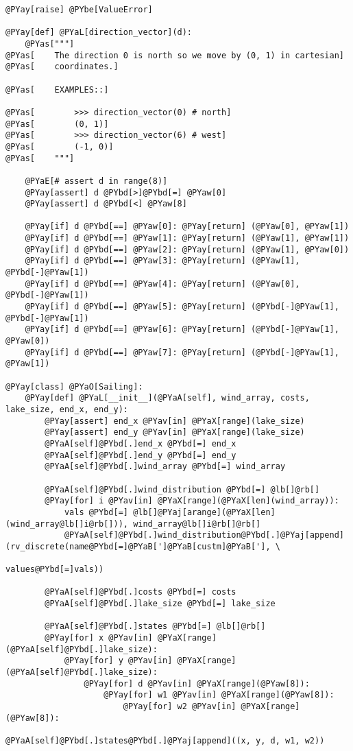 \begin{Verbatim}[commandchars=@\[\]]
    @PYay[raise] @PYbe[ValueError]

@PYay[def] @PYaL[direction_vector](d):
    @PYas["""]
@PYas[    The direction 0 is north so we move by (0, 1) in cartesian]
@PYas[    coordinates.]

@PYas[    EXAMPLES::]

@PYas[        >>> direction_vector(0) # north]
@PYas[        (0, 1)]
@PYas[        >>> direction_vector(6) # west]
@PYas[        (-1, 0)]
@PYas[    """]

    @PYaE[# assert d in range(8)]
    @PYay[assert] d @PYbd[>]@PYbd[=] @PYaw[0]
    @PYay[assert] d @PYbd[<] @PYaw[8]

    @PYay[if] d @PYbd[==] @PYaw[0]: @PYay[return] (@PYaw[0], @PYaw[1])
    @PYay[if] d @PYbd[==] @PYaw[1]: @PYay[return] (@PYaw[1], @PYaw[1])
    @PYay[if] d @PYbd[==] @PYaw[2]: @PYay[return] (@PYaw[1], @PYaw[0])
    @PYay[if] d @PYbd[==] @PYaw[3]: @PYay[return] (@PYaw[1], @PYbd[-]@PYaw[1])
    @PYay[if] d @PYbd[==] @PYaw[4]: @PYay[return] (@PYaw[0], @PYbd[-]@PYaw[1])
    @PYay[if] d @PYbd[==] @PYaw[5]: @PYay[return] (@PYbd[-]@PYaw[1], @PYbd[-]@PYaw[1])
    @PYay[if] d @PYbd[==] @PYaw[6]: @PYay[return] (@PYbd[-]@PYaw[1], @PYaw[0])
    @PYay[if] d @PYbd[==] @PYaw[7]: @PYay[return] (@PYbd[-]@PYaw[1], @PYaw[1])

@PYay[class] @PYaO[Sailing]:
    @PYay[def] @PYaL[__init__](@PYaA[self], wind_array, costs, lake_size, end_x, end_y):
        @PYay[assert] end_x @PYav[in] @PYaX[range](lake_size)
        @PYay[assert] end_y @PYav[in] @PYaX[range](lake_size)
        @PYaA[self]@PYbd[.]end_x @PYbd[=] end_x
        @PYaA[self]@PYbd[.]end_y @PYbd[=] end_y
        @PYaA[self]@PYbd[.]wind_array @PYbd[=] wind_array

        @PYaA[self]@PYbd[.]wind_distribution @PYbd[=] @lb[]@rb[]
        @PYay[for] i @PYav[in] @PYaX[range](@PYaX[len](wind_array)):
            vals @PYbd[=] @lb[]@PYaj[arange](@PYaX[len](wind_array@lb[]i@rb[])), wind_array@lb[]i@rb[]@rb[]
            @PYaA[self]@PYbd[.]wind_distribution@PYbd[.]@PYaj[append](rv_discrete(name@PYbd[=]@PYaB[']@PYaB[custm]@PYaB['], \
                                                    values@PYbd[=]vals))

        @PYaA[self]@PYbd[.]costs @PYbd[=] costs
        @PYaA[self]@PYbd[.]lake_size @PYbd[=] lake_size

        @PYaA[self]@PYbd[.]states @PYbd[=] @lb[]@rb[]
        @PYay[for] x @PYav[in] @PYaX[range](@PYaA[self]@PYbd[.]lake_size):
            @PYay[for] y @PYav[in] @PYaX[range](@PYaA[self]@PYbd[.]lake_size):
                @PYay[for] d @PYav[in] @PYaX[range](@PYaw[8]):
                    @PYay[for] w1 @PYav[in] @PYaX[range](@PYaw[8]):
                        @PYay[for] w2 @PYav[in] @PYaX[range](@PYaw[8]):
                            @PYaA[self]@PYbd[.]states@PYbd[.]@PYaj[append]((x, y, d, w1, w2))


\end{Verbatim}
